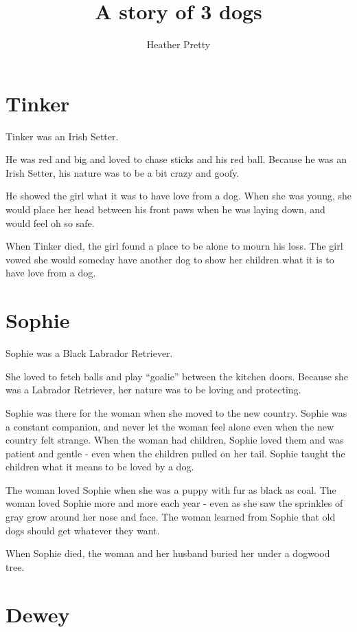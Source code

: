 \documentclass[
  openany]{book}
\title{A story of 3 dogs}
\author{Heather Pretty}
\date{}
\begin{document}
\maketitle

{
\setcounter{tocdepth}{1}
\tableofcontents
}
\hypertarget{tinker}{%
\chapter{Tinker}\label{tinker}}

Tinker was an Irish Setter.

He was red and big and loved to chase sticks and his red ball.
Because he was an Irish Setter, his nature was to be a bit crazy and goofy.

He showed the girl what it was to have love from a dog.
When she was young, she would place her head between his front paws when he was laying down, and would feel oh so safe.

When Tinker died, the girl found a place to be alone to mourn his loss.
The girl vowed she would someday have another dog to show her children what it is to have love from a dog.

\hypertarget{sophie}{%
\chapter{Sophie}\label{sophie}}

Sophie was a Black Labrador Retriever.

She loved to fetch balls and play ``goalie'' between the kitchen doors.
Because she was a Labrador Retriever, her nature was to be loving and protecting.

Sophie was there for the woman when she moved to the new country.
Sophie was a constant companion, and never let the woman feel alone even when the new country felt strange.
When the woman had children, Sophie loved them and was patient and gentle - even when the children pulled on her tail.
Sophie taught the children what it means to be loved by a dog.

The woman loved Sophie when she was a puppy with fur as black as coal.
The woman loved Sophie more and more each year - even as she saw the sprinkles of gray grow around her nose and face.
The woman learned from Sophie that old dogs should get whatever they want.

When Sophie died, the woman and her husband buried her under a dogwood tree.

\hypertarget{dewey}{%
\chapter{Dewey}\label{dewey}}
\end{document}
